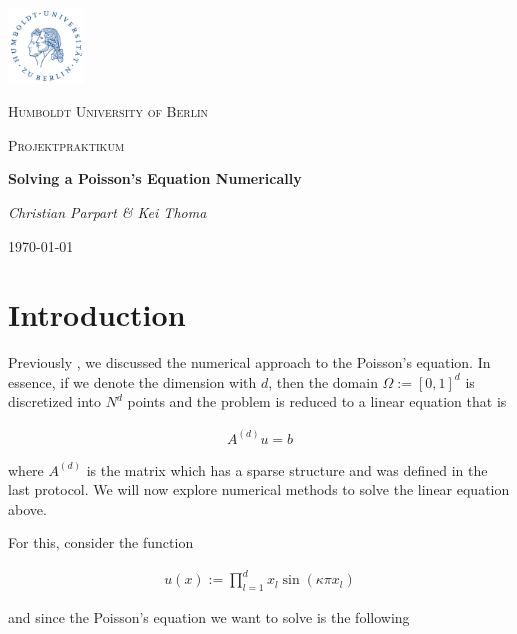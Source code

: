 \documentclass[refman]{article}
\theoremstyle{definition}
\begin{document}
\begin{titlepage}
	\centering
	\includegraphics[width=0.15\textwidth]{graphics/huberlin_logo}\par\vspace{1cm}
	{\scshape\LARGE Humboldt University of Berlin \par}
	\vspace{1cm}
	{\scshape\Large Projektpraktikum \par}
	\vspace{1.5cm}
	{\huge\bfseries Solving a Poisson's Equation Numerically \par}
	\vspace{2cm}
	{\Large\itshape Christian Parpart \& Kei Thoma \par}
	\vfill

	\vfill

	{\large \today\par}
\end{titlepage}

\tableofcontents

\section{Introduction}

Previously \cite{protocol}, we discussed the numerical approach to the Poisson's equation. In essence, if we denote the dimension with \(d\), then the domain \(\Omega := [0, 1]^d\) is discretized into \(N^d\) points and the problem is reduced to a linear equation that is

\begin{align*}
	A^{(d)} u = b
\end{align*}

where \(A^{(d)}\) is the matrix which has a sparse structure and was defined in the last protocol. We will now explore numerical methods to solve the linear equation above.

For this, consider the function

\begin{align*}
	u(x) := \prod_{l=1}^d x_l \sin (\kappa \pi x_l)
\end{align*}

and since the Poisson's equation we want to solve is the following
\end{document}
